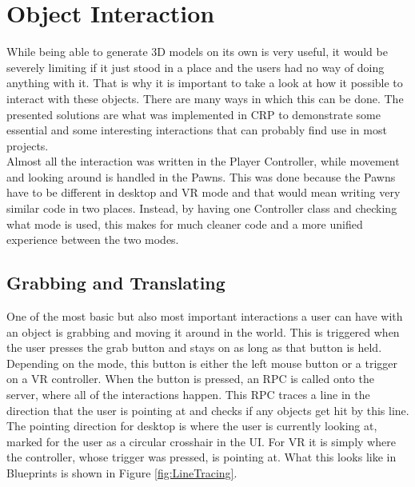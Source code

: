 

\section{Object Interaction}\label{chp:ObjectInteraction}
While being able to generate 3D models on its own is very useful, it would be severely limiting if it just stood in a place and the users had no way of doing anything with it. That is why it is important to take a look at how it possible to interact with these objects. There are many ways in which this can be done. The presented solutions are what was implemented in \acs{CRP} to demonstrate some essential and some interesting interactions that can probably find use in most projects.\\
Almost all the interaction was written in the Player Controller, while movement and looking around is handled in the Pawns. This was done because the Pawns have to be different in desktop and VR mode and that would mean writing very similar code in two places. Instead, by having one Controller class and checking what mode is used, this makes for much cleaner code and a more unified experience between the two modes.
\subsection{Grabbing and Translating}

One of the most basic but also most important interactions a user can have with an object is grabbing and moving it around in the world. This is triggered when the user presses the grab button and stays on as long as that button is held. Depending on the mode, this button is either the left mouse button or a trigger on a \acs{VR} controller. When the button is pressed, an \acs{RPC} is called onto the server, where all of the interactions happen. This \acs{RPC} traces a line in the direction that the user is pointing at and checks if any objects get hit by this line. The pointing direction for desktop is where the user is currently looking at, marked for the user as a circular crosshair in the UI. For VR it is simply where the controller, whose trigger was pressed, is pointing at. What this looks like in Blueprints is shown in Figure \ref{fig:LineTracing}.

